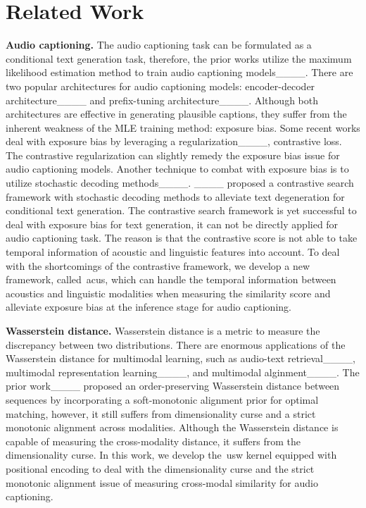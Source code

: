 \section{Related Work}
\label{related_work}
\textbf{Audio captioning.} The audio captioning task can be formulated as a conditional text generation task, therefore, the prior works utilize the maximum likelihood estimation method to train audio captioning models____. There are two popular architectures for audio captioning models: encoder-decoder architecture____ and prefix-tuning architecture____. Although both architectures are effective in generating plausible captions, they suffer from the inherent weakness of the MLE training method: exposure bias. Some recent works deal with exposure bias by leveraging a regularization____, contrastive loss. The contrastive regularization can slightly remedy the exposure bias issue for audio captioning models. Another technique to combat with exposure bias is to utilize stochastic decoding methods____. ____ proposed a contrastive search framework with stochastic decoding methods to alleviate text degeneration for conditional text generation. The contrastive search framework is yet successful to deal with exposure bias for text generation, it can not be directly applied for audio captioning task. The reason is that the contrastive score is not able to take temporal information of acoustic and linguistic features into account. To deal with the shortcomings of the contrastive framework, we develop a new framework, called~\acrshort{acus}, which can handle the temporal information between acoustics and linguistic modalities when measuring the similarity score and alleviate exposure bias at the inference stage for audio captioning. 


\textbf{Wasserstein distance.} Wasserstein distance is a metric to measure the discrepancy between two distributions. There are enormous applications of the Wasserstein distance for multimodal learning, such as audio-text retrieval____, multimodal representation learning____, and multimodal alginment____. The prior work____ proposed an order-preserving Wasserstein distance between sequences by incorporating a soft-monotonic alignment prior for optimal matching, however, it still suffers from dimensionality curse and a strict monotonic alignment across modalities. Although the Wasserstein distance is capable of measuring the cross-modality distance, it suffers from the dimensionality curse. In this work, we develop the~\acrshort{usw} kernel equipped with positional encoding to deal with the dimensionality curse and the strict monotonic alignment issue of measuring cross-modal similarity for audio captioning.